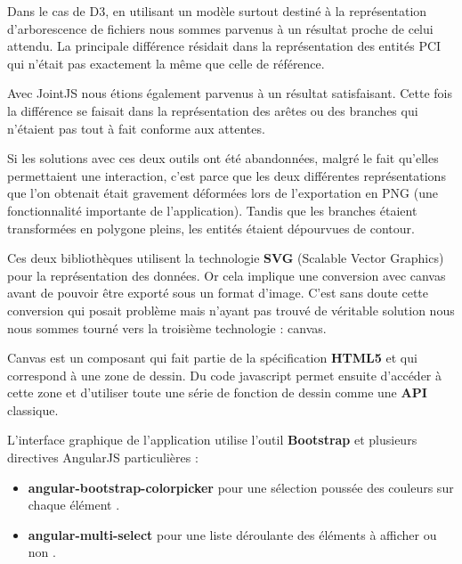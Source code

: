 \documentclass [a4paper,11pt]{article}
\begin{document}
Dans le cas de D3, en utilisant un modèle surtout destiné à la représentation d’arborescence de fichiers \cite{Bostock16} nous sommes parvenus à un résultat proche de celui attendu. La principale différence résidait dans la représentation des entités PCI qui n’était pas exactement la même que celle de référence.
\newline

Avec JointJS nous étions également parvenus à un résultat satisfaisant. Cette fois la différence se faisait dans la représentation des arêtes ou des branches qui n’étaient pas tout à fait conforme aux attentes.
\newline

Si les solutions avec ces deux outils ont été abandonnées, malgré le fait qu’elles permettaient une interaction, c’est parce que les deux différentes représentations que l’on obtenait était gravement déformées lors de l’exportation en PNG (une fonctionnalité importante de l’application). Tandis que les branches étaient transformées en polygone pleins, les entités étaient dépourvues de contour. 
\newline

Ces deux bibliothèques utilisent la technologie \textbf{SVG} (Scalable Vector Graphics) pour la représentation des données. Or cela implique une conversion avec canvas avant de pouvoir être exporté sous un format d’image. C’est sans doute cette conversion qui posait problème mais n’ayant pas trouvé de véritable solution nous nous sommes tourné vers la troisième technologie : canvas.
\newline

Canvas est un composant qui fait partie de la spécification \textbf{HTML5} et qui correspond à une zone de dessin. Du code javascript permet ensuite d’accéder à cette zone et d’utiliser toute une série de fonction de dessin comme une \textbf{API} classique.
\newline

L’interface graphique de l’application utilise l’outil \textbf{Bootstrap} et plusieurs directives AngularJS particulières :
\newline

\begin{itemize}
 \item \textbf{angular-bootstrap-colorpicker} pour une sélection poussée des couleurs sur chaque élément \cite{colorpicker13}.
 \item \textbf{angular-multi-select} pour une liste déroulante des éléments à afficher ou non \cite{select14}.
 \newline
\end{itemize}
\end{document}
